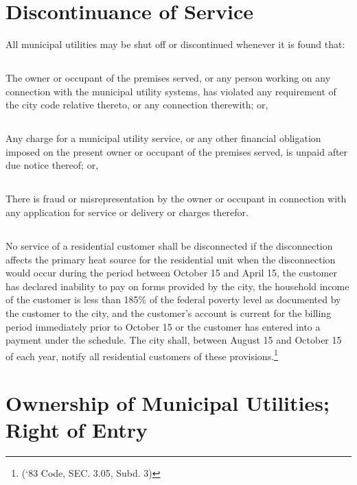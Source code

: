 \section{Discontinuance of Service}
All municipal utilities may be shut off or discontinued whenever it is found that:
\subsection{}
The owner or occupant of the premises served, or any person working on any connection with the municipal utility systems, has violated any requirement of the city code relative thereto, or any connection therewith; or,
\subsection{}
Any charge for a municipal utility service, or any other financial obligation imposed on the present owner or occupant of the premises served, is unpaid after due notice thereof; or,
\subsection{}
There is fraud or misrepresentation by the owner or occupant in connection with any application for service or delivery or charges therefor.
\subsection{}
No service of a residential customer shall be disconnected if the disconnection affects the primary heat source for the residential unit when the disconnection would occur during the period between October 15 and April 15, the customer has declared inability to pay on forms provided by the city, the household income of the customer is less than 185\% of the federal poverty level as documented by the customer to the city, and the customer’s account is current for the billing period immediately prior to October 15 or the customer has entered into a payment under the schedule.  The city shall, between August 15 and October 15 of each year, notify all residential customers of these provisions.\footnote{(‘83 Code, SEC. 3.05, Subd. 3)}

\section{Ownership of Municipal Utilities; Right of Entry}
